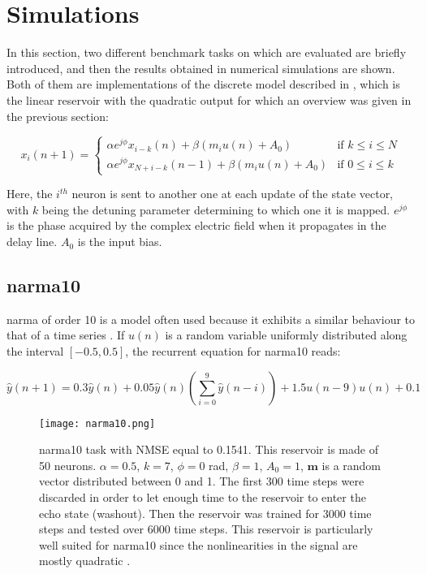 \section{Simulations}

In this section, two different benchmark tasks on which \rcer are evaluated are briefly introduced, and then the results obtained in numerical simulations are shown. Both of them are implementations of the discrete model described in \cite{Vinckier2015}, which is the linear reservoir with the quadratic output for which an overview was given in the previous section:

\begin{equation}
	x_i(n+1) = 
	\begin{cases}
		\alpha e^{j\phi} x_{i-k}(n)+\beta \left(m_i u(n) +A_0 \right) & \text{if } k \leq i \leq N\\
		\alpha e^{j\phi} x_{N+i-k}(n-1)+\beta \left(m_i u(n) +A_0 \right) & \text{if } 0 \leq i \leq k			
	\end{cases}
\end{equation}

Here, the $i^{th}$ neuron is sent to another one at each update of the state vector, with $k$ being the detuning parameter determining to which one it is mapped. $e^{j\phi}$ is the phase acquired by the complex electric field when it propagates in the delay line. $A_0$ is the input bias.

\subsection{\gls{narma}10}

\acrlong{narma} of order 10 is a model often used because it exhibits a similar behaviour to that of a time series \cite{Paquot2012}. If $u(n)$ is a random variable uniformly distributed along the interval $[-0.5, 0.5]$, the recurrent equation for \gls{narma}10 reads:

\begin{equation}
	\hat{y}(n+1) = 0.3\hat{y}(n)+0.05\hat{y}(n)\left(\sum_{i=0}^9 \hat{y}(n-i) \right)+1.5u(n-9)u(n)+0.1
\end{equation}

\begin{figure}[h]
	\centering
	\texttt{[image: narma10.png]}
	\caption{\gls{narma}10 task with NMSE equal to 0.1541. This reservoir is made of 50 neurons. $\alpha=0.5$, $k=7$, $\phi=0$ rad, $\beta=1$, $A_0=1$, $\mathbf{m}$ is a random vector distributed between 0 and 1. The first 300 time steps were discarded in order to let enough time to the reservoir to enter the echo state (washout). Then the reservoir was trained for 3000 time steps and tested over 6000 time steps. This reservoir is particularly well suited for  \gls{narma}10 since the nonlinearities in the signal are mostly quadratic \cite{Vinckier2015}.}
	\label{narma10}
\end{figure}

